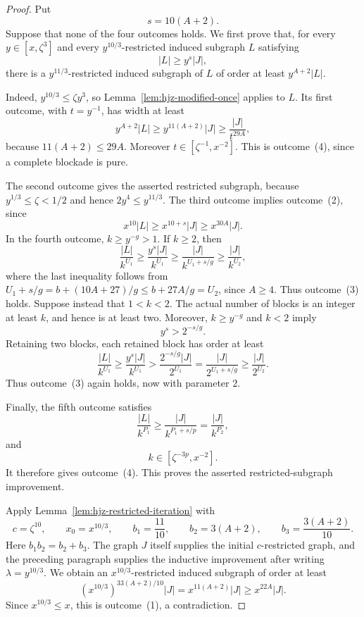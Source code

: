 \documentclass[11pt]{article}
\numberwithin{equation}{section}
\theoremstyle{plain}
\theoremstyle{definition}
\begin{document}
\begin{proof}
Put
\[
                              s=10(A+2).
\]
Suppose that none of the four outcomes holds.  We first prove that, for
every $y\in[x,\zeta^3]$ and every $y^{10/3}$-restricted induced
subgraph $L$ satisfying
\begin{equation}
                              |L|\geq y^s|J|,
\label{eq:hjz-iterative-L}
\end{equation}
there is a $y^{11/3}$-restricted induced subgraph of $L$ of order at
least $y^{A+2}|L|$.

Indeed, $y^{10/3}\leq\zeta y^3$, so
Lemma~\ref{lem:hjz-modified-once} applies to $L$.  Its first outcome,
with $t=y^{-1}$, has width at least
\[
 y^{A+2}|L|
   \geq y^{11(A+2)}|J|
   \geq \frac{|J|}{t^{29A}},
\]
because $11(A+2)\leq29A$.  Moreover
$t\in[\zeta^{-1},x^{-2}]$.  This is outcome~(4), since a complete
blockade is pure.

The second outcome gives the asserted restricted subgraph, because
$y^{1/3}\leq\zeta<1/2$ and hence
$2y^4\leq y^{11/3}$.  The third outcome implies outcome~(2), since
\[
             x^{10}|L|\geq x^{10+s}|J|
                       \geq x^{30A}|J|.
\]
In the fourth outcome, $k\geq y^{-g}>1$.  If $k\geq2$, then
\[
 \frac{|L|}{k^{U_1}}
      \geq \frac{y^s|J|}{k^{U_1}}
      \geq \frac{|J|}{k^{U_1+s/g}}
      \geq \frac{|J|}{k^{U_2}},
\]
where the last inequality follows from
$U_1+s/g=b+(10A+27)/g\leq b+27A/g=U_2$, since $A\geq4$.
Thus outcome~(3) holds.  Suppose instead that $1<k<2$.  The actual
number of blocks is an integer at least $k$, and hence is at least two.
Moreover, $k\geq y^{-g}$ and $k<2$ imply
\[
                         y^s>2^{-s/g}.
\]
Retaining two blocks, each retained block has order at least
\[
 \frac{|L|}{k^{U_1}}
   \geq \frac{y^s|J|}{k^{U_1}}
   > \frac{2^{-s/g}|J|}{2^{U_1}}
   = \frac{|J|}{2^{U_1+s/g}}
   \geq \frac{|J|}{2^{U_2}}.
\]
Thus outcome~(3) again holds, now with parameter $2$.

Finally, the fifth outcome satisfies
\[
 \frac{|L|}{k^{P_1}}
      \geq \frac{|J|}{k^{P_1+s/p}}
      =\frac{|J|}{k^{P_2}},
\]
and
\[
              k\in[\zeta^{-3p},x^{-2}].
\]
It therefore gives outcome~(4).  This proves the asserted
restricted-subgraph improvement.

Apply Lemma~\ref{lem:hjz-restricted-iteration} with
\[
 c=\zeta^{10},\qquad x_0=x^{10/3},\qquad
 b_1=\frac{11}{10},\qquad
 b_2=3(A+2),\qquad b_3=\frac{3(A+2)}{10}.
\]
Here $b_1b_2=b_2+b_3$.  The graph $J$ itself supplies the initial
$c$-restricted graph, and the preceding paragraph supplies the
inductive improvement after writing $\lambda=y^{10/3}$.  We obtain an
$x^{10/3}$-restricted induced subgraph of order at least
\[
 (x^{10/3})^{33(A+2)/10}|J|
       =x^{11(A+2)}|J|
       \geq x^{22A}|J|.
\]
Since $x^{10/3}\leq x$, this is outcome~(1), a contradiction.
\end{proof}
\end{document}
